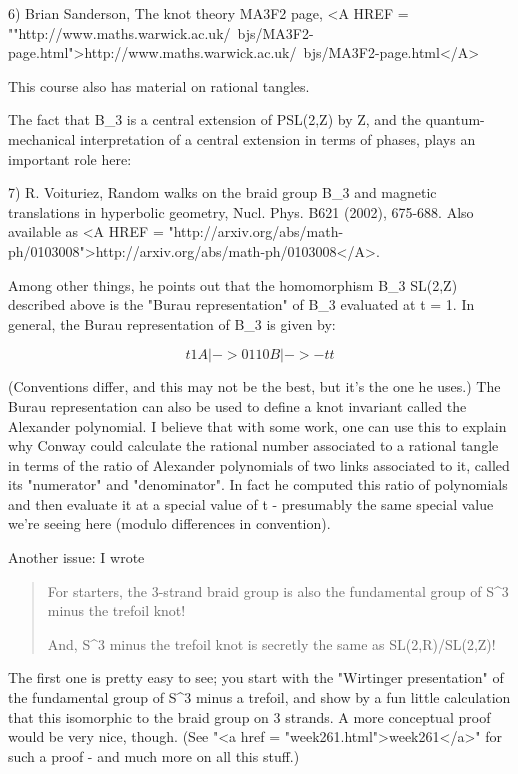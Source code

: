 6) Brian Sanderson, The knot theory MA3F2 page, 
<A HREF = ""http://www.maths.warwick.ac.uk/~bjs/MA3F2-page.html">http://www.maths.warwick.ac.uk/~bjs/MA3F2-page.html</A>

This course also has material on rational tangles.

The fact that B_{3} is a central extension of
PSL(2,Z) by Z, and the quantum-mechanical interpretation of
a central extension in terms of phases, plays an important role
here:


7) R. Voituriez, Random walks on the braid group B_{3} 
and magnetic translations in hyperbolic geometry, Nucl. Phys. B621 
(2002), 675-688.  Also available as 
<A HREF = "http://arxiv.org/abs/math-ph/0103008">http://arxiv.org/abs/math-ph/0103008</A>.

Among other things, he points out that the homomorphism
B_{3} \to  SL(2,Z) described above is the "Burau
representation" of B_{3} evaluated at t = 1.
In general, the Burau representation of B_{3} is given 
by:


$$

        t   1
A |->  
        0   1


        1   0
B |->  
       -t   t
$$
    
(Conventions differ, and this may not be the best, but it's
the one he uses.)  The Burau representation can also be used
to define a knot invariant called the Alexander polynomial.  
I believe that with some work, one can use this to explain
why Conway could calculate the rational number associated to a
rational tangle in terms of the ratio of Alexander polynomials of two
links associated to it, called its "numerator" and
"denominator".  In fact he computed this ratio of
polynomials and then evaluate it at a special value of t - 
presumably the same special value we're seeing here (modulo
differences in convention).

Another issue: I wrote

\begin{quote}
For starters, the 3-strand braid group is also the fundamental group of 
S^{3} minus the trefoil knot!

And, S^{3} minus the trefoil knot is secretly the same as
SL(2,R)/SL(2,Z)!
\end{quote}

The first one is pretty easy to see; you start with the "Wirtinger 
presentation" of the fundamental group of S^{3} minus a 
trefoil, and show by a fun little calculation that this isomorphic to the 
braid group on 3 strands.  A more conceptual proof would be very nice, though.
(See "<a href = "week261.html">week261</a>" for such a proof -
and much more on all this stuff.)

